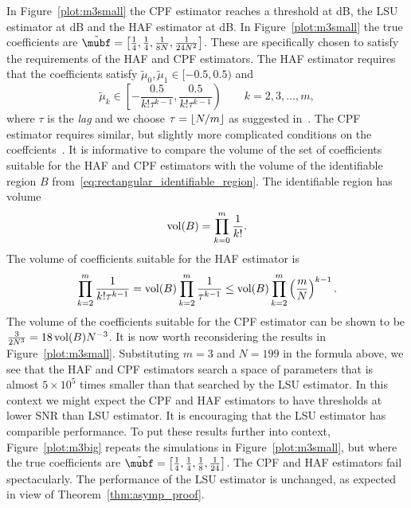 \documentclass[journal]{IEEEtran}
\begin{document}
In Figure~\ref{plot:m3small} the CPF estimator reaches a threshold at \unit[1]{dB}, the LSU estimator at \unit[3]{dB} and the HAF estimator at \unit[5]{dB}.  In Figure~\ref{plot:m3small} the true coefficients are $\tilde{\mubf} = \left[ \tfrac{1}{4}, \tfrac{1}{4}, \tfrac{1}{8N}, \tfrac{1}{24N^2}  \right]$.  These are specifically chosen to satisfy the requirements of the HAF and CPF estimators.  The HAF estimator requires that the coefficients satisfy $\tilde{\mu}_0, \tilde{\mu}_1 \in [-0.5, 0.5)$ and
\[
\tilde{\mu}_k \in \left[ -\frac{0.5}{k! \tau^{k-1}}, \frac{0.5}{k! \tau^{k-1}}\right) \qquad k = 2,3,\dots,m,
\]
where $\tau$ is the \emph{lag} and we choose $\tau = {\left\lfloor N/m \right\rfloor}$ as suggested in~\cite{Peleg_DPT_1995}.  The CPF estimator requires similar, but slightly more complicated conditions on the coeffcients~\cite{Oshea_cpf_2004}.  It is informative to compare the volume of the set of coefficients suitable for the HAF and CPF estimators with the volume of the identifiable region $B$ from~\eqref{eq:rectangular_identifiable_region}. The identifiable region has volume 
\[
\operatorname{vol}(B) = \prod_{k=0}^m {\frac{1}{k!}}.
\]
The volume of coefficients suitable for the HAF estimator is
\[
\prod_{k=2}^m \frac{1}{k! \tau^{k-1}} =  \operatorname{vol}(B) \prod_{k=2}^m \frac{1}{\tau^{k-1}} \leq \operatorname{vol}(B) \prod_{k=2}^m \left( \frac{m}{N} \right)^{k-1}.
\]
The volume of the coefficients suitable for the CPF estimator can be shown to be $\tfrac{3}{2N^3} = 18 \operatorname{vol}(B) N^{-3}$.  It is now worth reconsidering the results in Figure~\ref{plot:m3small}.  Substituting $m=3$ and $N=199$ in the formula above, we see that the HAF and CPF estimators search a space of parameters that is almost $5 \times 10^5$ times smaller than that searched by the LSU estimator.  In this context we might expect the CPF and HAF estimators to have thresholds at lower SNR than LSU estimator.  It is encouraging that the LSU estimator has comparible performance.  To put these results further into context, Figure~\ref{plot:m3big} repeats the simulations in Figure~\ref{plot:m3small}, but where the true coefficients are $\tilde{\mubf} = \left[ \tfrac{1}{4}, \tfrac{1}{4}, \tfrac{1}{8}, \tfrac{1}{24}  \right]$.  The CPF and HAF estimators fail spectacularly.  The performance of the LSU estimator is unchanged, as expected in view of Theorem~\ref{thm:asymp_proof}.
\end{document}
